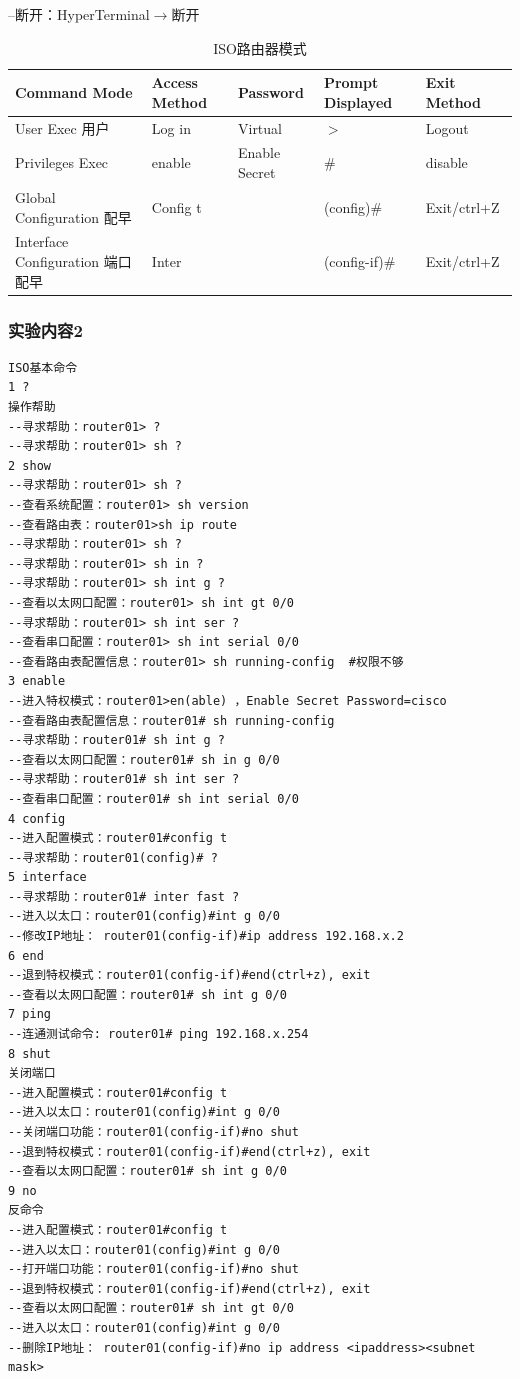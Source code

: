 \documentclass[lang=cn,11pt,a4paper,cite=authoryear]{elegantpaper}
\begin{document}
--断开：HyperTerminal$\rightarrow$断开
\begin{table}[htbp]
	\centering
\begin{tabular}{|l|l|l|l|l|}
	\hline Command Mode & Access Method & Password & Prompt Displayed & Exit Method \\
	\hline User Exec 用户 & Log in & Virtual & $>$ & Logout \\
	\hline Privileges Exec & enable & Enable Secret & $\#$ & disable \\
	\hline Global Configuration 配早 & Config t & & (config)$\#$ & Exit/ctrl+Z \\
	\hline Interface Configuration 端口配早 & Inter & & (config-if)$\#$ & Exit/ctrl+Z \\
	\hline
\end{tabular}
\caption{ISO路由器模式}
\end{table}
\subsubsection{实验内容2}
\begin{lstlisting}
ISO基本命令
1 ?
操作帮助
--寻求帮助：router01> ?
--寻求帮助：router01> sh ?
2 show
--寻求帮助：router01> sh ?
--查看系统配置：router01> sh version
--查看路由表：router01>sh ip route
--寻求帮助：router01> sh ?
--寻求帮助：router01> sh in ?
--寻求帮助：router01> sh int g ?
--查看以太网口配置：router01> sh int gt 0/0
--寻求帮助：router01> sh int ser ?
--查看串口配置：router01> sh int serial 0/0
--查看路由表配置信息：router01> sh running-config  #权限不够
3 enable
--进入特权模式：router01>en(able) ，Enable Secret Password=cisco
--查看路由表配置信息：router01# sh running-config 
--寻求帮助：router01# sh int g ?
--查看以太网口配置：router01# sh in g 0/0
--寻求帮助：router01# sh int ser ?
--查看串口配置：router01# sh int serial 0/0
4 config
--进入配置模式：router01#config t
--寻求帮助：router01(config)# ?
5 interface
--寻求帮助：router01# inter fast ?
--进入以太口：router01(config)#int g 0/0
--修改IP地址： router01(config-if)#ip address 192.168.x.2
6 end
--退到特权模式：router01(config-if)#end(ctrl+z), exit
--查看以太网口配置：router01# sh int g 0/0
7 ping 
--连通测试命令: router01# ping 192.168.x.254
8 shut
关闭端口
--进入配置模式：router01#config t
--进入以太口：router01(config)#int g 0/0
--关闭端口功能：router01(config-if)#no shut
--退到特权模式：router01(config-if)#end(ctrl+z), exit
--查看以太网口配置：router01# sh int g 0/0
9 no
反命令
--进入配置模式：router01#config t
--进入以太口：router01(config)#int g 0/0
--打开端口功能：router01(config-if)#no shut
--退到特权模式：router01(config-if)#end(ctrl+z), exit
--查看以太网口配置：router01# sh int gt 0/0
--进入以太口：router01(config)#int g 0/0
--删除IP地址： router01(config-if)#no ip address <ipaddress><subnet mask>

\end{lstlisting}
\end{document}
